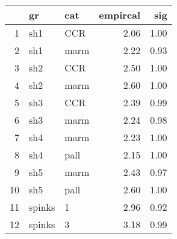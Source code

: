 \begin{table}[ht]
\centering
\begin{tabular}{rllrr}
  \hline
 & gr & cat & empircal & sig \\ 
  \hline
1 & sh1 & CCR & 2.06 & 1.00 \\ 
  2 & sh1 & marm & 2.22 & 0.93 \\ 
  3 & sh2 & CCR & 2.50 & 1.00 \\ 
  4 & sh2 & marm & 2.60 & 1.00 \\ 
  5 & sh3 & CCR & 2.39 & 0.99 \\ 
  6 & sh3 & marm & 2.24 & 0.98 \\ 
  7 & sh4 & marm & 2.23 & 1.00 \\ 
  8 & sh4 & pall & 2.15 & 1.00 \\ 
  9 & sh5 & marm & 2.43 & 0.97 \\ 
  10 & sh5 & pall & 2.60 & 1.00 \\ 
  11 & spinks & 1 & 2.96 & 0.92 \\ 
  12 & spinks & 3 & 3.18 & 0.99 \\ 
   \hline
\end{tabular}
\label{mmmiss}
\end{table}
